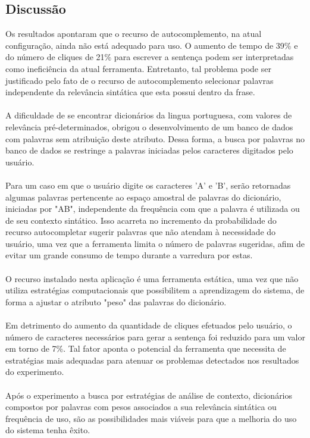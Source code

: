 \documentclass[twoside]{article}
\begin{document}
\begin{multicols}{2}
\section{Discussão}
Os resultados apontaram que o recurso de autocomplemento, na atual configuração, ainda não está adequado para uso. O aumento de tempo de 39\% e do número de cliques de 21\% para escrever a sentença podem ser interpretadas como ineficiência da atual ferramenta. Entretanto, tal problema pode ser justificado pelo fato de o recurso de autocomplemento selecionar palavras independente da relevância sintática que esta possui dentro da frase. 
\\\\
A dificuldade de se encontrar dicionários da lingua portuguesa, com valores de relevância pré-determinados, obrigou o desenvolvimento de um banco de dados com palavras sem atribuição deste atributo. Dessa forma, a busca por palavras no banco de dados se restringe a palavras iniciadas pelos caracteres digitados pelo usuário. 
\\\\
Para um caso em que o usuário digite os caracteres 'A' e 'B', serão retornadas algumas palavras pertencente ao espaço amostral de palavras do dicionário, iniciadas por "AB", independente da frequência com que a palavra é utilizada ou de seu contexto sintático. Isso acarreta no incremento da probabilidade do recurso autocompletar sugerir palavras que não atendam à necessidade do usuário, uma vez que a ferramenta limita o número de palavras sugeridas, afim de evitar um grande consumo de tempo durante a varredura por estas.
\\\\
O recurso instalado nesta aplicação é uma ferramenta estática, uma vez que não utiliza estratégias computacionais que possibilitem a aprendizagem do sistema, de forma a ajustar o atributo "peso" das palavras do dicionário.
\\\\
Em detrimento do aumento da quantidade de cliques efetuados pelo usuário, o número de caracteres necessários para gerar a sentença foi reduzido para um valor em torno de 7\%. Tal fator aponta o potencial da ferramenta que necessita de estratégias mais adequadas para atenuar os problemas detectados nos resultados do experimento.
\\\\
Após o experimento a busca por estratégias de análise de contexto, dicionários compostos por palavras com pesos associados a sua relevância sintática ou frequência de uso, são as possibilidades mais viáveis para que a melhoria do uso do sistema tenha êxito.


\end{multicols}
\end{document}
